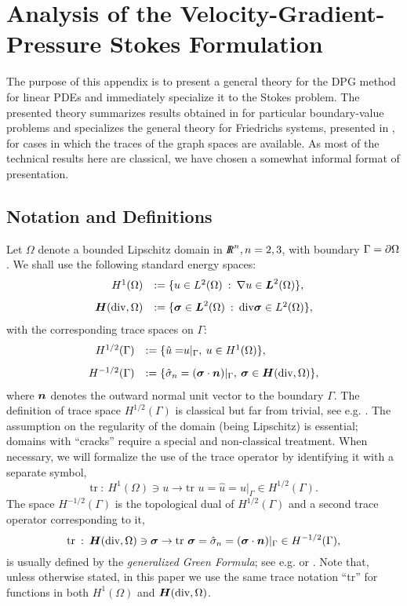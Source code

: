 \section{Analysis of the Velocity-Gradient-Pressure Stokes Formulation}
\label{sec:StokesAnalysis}

The purpose of this appendix is to present a general theory for the DPG
method for linear PDEs and immediately specialize it to the Stokes
problem. The presented theory summarizes results obtained in
\cite{DPG6,BramwellDemkowiczGopalakrishnanQiu11,DemkowiczGopalakrishnanMugaZitelli12}
for particular boundary-value problems and specializes the
general theory for Friedrichs systems, presented in
\cite{Bui-ThanhDemkowiczGhattas11b}, for cases in which the traces of the graph spaces
are available.  As most of the technical results here are classical,
we have chosen a somewhat informal format of presentation.


\subsection{Notation and Definitions\label{section:notation}}


Let $\Omega$ denote a bounded Lipschitz domain in $\doubleIR^n, n=2,3$,\: with boundary
$\Gamma = \ptl \Omega$. We shall use the following standard energy spaces:
\[
\begin{array}{rl}
H^1(\Omega) & := \{ u \in L^2(\Omega) \: : \: \bfnab u \in \bfL^2(\Omega) \}, \\[8pt]
\bfH(\text{div},\Omega) & := \{ \bfsig \in \bfL^2(\Omega) \: : \: \text{div} \bfsig \in L^2(\Omega) \}, 
\end{array}
\]
with the corresponding trace spaces on $\Gamma$:
\[
\begin{array}{rl}
H^{1/2}(\Gamma) & := \{ 
{\hat{u} =} u\vert_{\Gamma}, \: u \in H^1(\Omega) \},
\\[8pt] H^{-1/2}(\Gamma) & := \{ {\hat{\sigma}_{n}} = (\bfsig \cdot
\bfn)\vert_{\Gamma} ,\: \bfsig \in \bfH(\text{div},\Omega) \},
\end{array}
\] 
where $\bfn$ denotes the outward normal unit vector to the boundary
$\Gamma$.  The definition of trace space $H^{1/2}(\Gamma)$ is
classical but far from trivial, see e.g.  \cite[pp. 96]{McLean}.  The
assumption on the regularity of the domain (being Lipschitz) is
essential; domains with ``cracks'' require a special and
non-classical treatment. When necessary, we will formalize the use of
the trace operator by identifying it with a separate symbol, 
\[
\text{tr} \: : \: H^1(\Omega) \ni u \to \text{tr } u = {\hat{u} =} u\vert_{\Gamma}
\in H^{1/2}(\Gamma).  
\] 
The space $H^{-1/2}(\Gamma)$ is the topological
dual of $H^{1/2}(\Gamma)$ and a second trace operator corresponding to it,
\[ \text{tr} \: : \: \bfH(\text{div},\Omega) \ni \bfsig \to \text{tr
} \bfsig = {\hat{\sigma}_n} = (\bfsig \cdot \bfn)\vert_{\Gamma} \in
H^{-1/2}(\Gamma),
\] 
is usually defined by the {\em generalized Green
  Formula}; see e.g. \cite[pp. 61]{Showalter} or
\cite[pp. 530]{FAbook}. Note that, unless otherwise stated, in this
paper we use the same trace notation ``tr'' for functions in both
$H^1(\Omega)$ and $\bfH(\text{div},\Omega)$.

